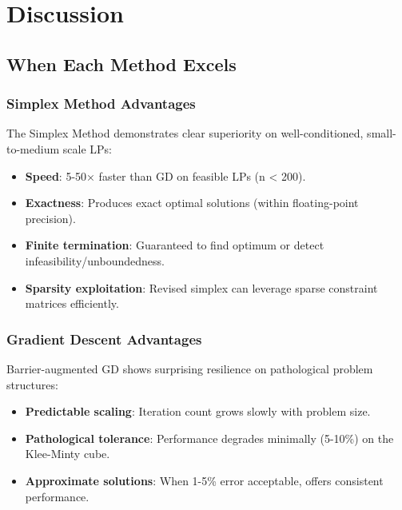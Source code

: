 \documentclass[11pt]{article}
\begin{document}

\section{Discussion}

\subsection{When Each Method Excels}

\subsubsection{Simplex Method Advantages}
The Simplex Method demonstrates clear superiority on well-conditioned, small-to-medium scale LPs:
\begin{itemize}
    \item \textbf{Speed}: 5-50× faster than GD on feasible LPs (n < 200).
    \item \textbf{Exactness}: Produces exact optimal solutions (within floating-point precision).
    \item \textbf{Finite termination}: Guaranteed to find optimum or detect infeasibility/unboundedness.
    \item \textbf{Sparsity exploitation}: Revised simplex can leverage sparse constraint matrices efficiently.
\end{itemize}

\subsubsection{Gradient Descent Advantages}
Barrier-augmented GD shows surprising resilience on pathological problem structures:
\begin{itemize}
    \item \textbf{Predictable scaling}: Iteration count grows slowly with problem size.
    \item \textbf{Pathological tolerance}: Performance degrades minimally (5-10\%) on the Klee-Minty cube.
    \item \textbf{Approximate solutions}: When 1-5\% error acceptable, offers consistent performance.
\end{itemize}
\end{document}
